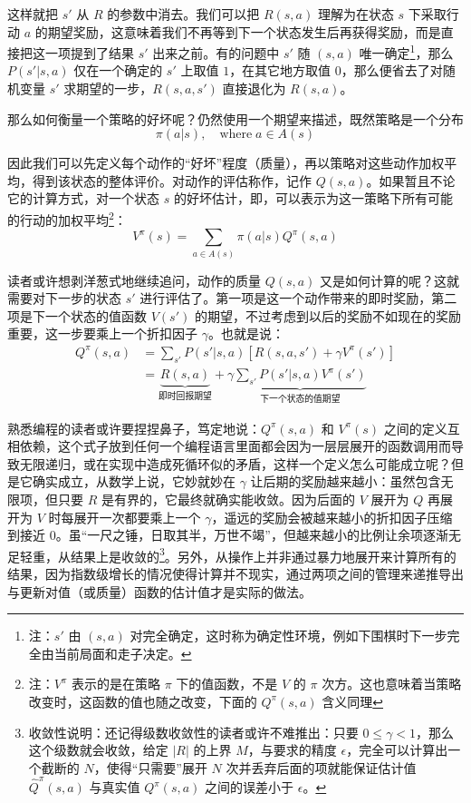 这样就把 $s'$ 从 $R$ 的参数中消去。我们可以把 $R(s, a)$ 理解为在状态 $s$ 下采取行动 $a$ 的期望奖励，这意味着我们不再等到下一个状态发生后再获得奖励，而是直接把这一项提到了结果 $s'$ 出来之前。有的问题中 $s'$ 随 $(s, a)$ 唯一确定\footnote{注：$s'$ 由 $(s, a)$ 对完全确定，这时称为确定性环境，例如下围棋时下一步完全由当前局面和走子决定。}，那么 $P(s' | s, a)$ 仅在一个确定的 $s'$ 上取值 $1$，在其它地方取值 $0$，那么便省去了对随机变量 $s'$ 求期望的一步，$R(s, a, s')$ 直接退化为 $R(s, a)$。

那么如何衡量一个策略的好坏呢？仍然使用一个期望来描述，既然策略是一个分布
\[
    \pi(a | s), \quad \text{where} \; a \in A(s)
\]

因此我们可以先定义每个动作的“好坏”程度（质量），再以策略对这些动作加权平均，得到该状态的整体评价。对动作的评估称作，记作 $Q(s, a)$。如果暂且不论它的计算方式，对一个状态 $s$ 的好坏估计，即，可以表示为这一策略下所有可能的行动的加权平均\footnote{注：$V^\pi$ 表示的是在策略 $\pi$ 下的值函数，不是 $V$ 的 $\pi$ 次方。这也意味着当策略改变时，这函数的值也随之改变，下面的 $Q^\pi (s, a)$ 含义同理}：
\[
    V^\pi (s) = \sum_{a \in A(s)} \pi(a | s) Q^\pi (s, a)
\]

读者或许想剥洋葱式地继续追问，动作的质量 $Q(s, a)$ 又是如何计算的呢？这就需要对下一步的状态 $s'$ 进行评估了。第一项是这一个动作带来的即时奖励，第二项是下一个状态的值函数 $V(s')$ 的期望，不过考虑到以后的奖励不如现在的奖励重要，这一步要乘上一个折扣因子 $\gamma$。也就是说：
\[
\begin{aligned}
    Q^\pi (s, a) &= 
    \sum_{s'} P(s' | s, a) \left[ R(s, a, s') + \gamma V^\pi (s') \right] \\
    &= \underset{\text{即时回报期望}}{\underbrace{R(s, a)}} + \gamma \underset{\text{下一个状态的值期望}}{\underbrace{\sum_{s'} P(s' | s, a) V^\pi (s')}}
\end{aligned}
\]

熟悉编程的读者或许要捏捏鼻子，笃定地说：$Q^\pi (s, a)$ 和 $V^\pi (s)$ 之间的定义互相依赖，这个式子放到任何一个编程语言里面都会因为一层层展开的函数调用而导致无限递归，或在实现中造成死循环似的矛盾，这样一个定义怎么可能成立呢？但是它确实成立，从数学上说，它妙就妙在 $\gamma$ 让后期的奖励越来越小：虽然包含无限项，但只要 $R$ 是有界的，它最终就确实能收敛。因为后面的 $V$ 展开为 $Q$ 再展开为 $V$ 时每展开一次都要乘上一个 $\gamma$，遥远的奖励会被越来越小的折扣因子压缩到接近 $0$。虽“一尺之锤，日取其半，万世不竭”，但越来越小的比例让余项逐渐无足轻重，从结果上是收敛的\footnote{收敛性说明：还记得级数收敛性的读者或许不难推出：只要 $0 \le \gamma < 1$，那么这个级数就会收敛，给定 $|R|$ 的上界 $M$，与要求的精度 $\epsilon$，完全可以计算出一个截断的 $N$，使得“只需要”展开 $N$ 次并丢弃后面的项就能保证估计值 $\hat Q^\pi (s, a)$ 与真实值 $Q^\pi (s, a)$ 之间的误差小于 $\epsilon$。}。另外，从操作上并非通过暴力地展开来计算所有的结果，因为指数级增长的情况使得计算并不现实，通过两项之间的管理来递推导出与更新对值（或质量）函数的估计值才是实际的做法。

